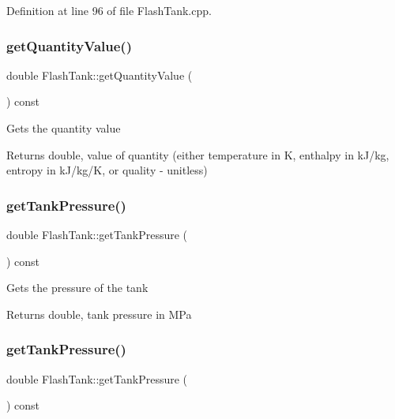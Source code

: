 Definition at line 96 of file Flash\+Tank.\+cpp.

\mbox{\label{class_flash_tank_ab2145598969881df58736a1b65326d17}} 
\subsubsection{\texorpdfstring{get\+Quantity\+Value()}{getQuantityValue()}\hspace{0.1cm}{\footnotesize\ttfamily [3/3]}}
{\footnotesize\ttfamily double Flash\+Tank\+::get\+Quantity\+Value (\begin{DoxyParamCaption}{ }\end{DoxyParamCaption}) const}

Gets the quantity value \begin{DoxyReturn}{Returns}
double, value of quantity (either temperature in K, enthalpy in k\+J/kg, entropy in k\+J/kg/K, or quality -\/ unitless) 
\end{DoxyReturn}
\mbox{\label{class_flash_tank_af5d4f0bf7babe61120e1e4452594e1af}} 
\subsubsection{\texorpdfstring{get\+Tank\+Pressure()}{getTankPressure()}\hspace{0.1cm}{\footnotesize\ttfamily [1/3]}}
{\footnotesize\ttfamily double Flash\+Tank\+::get\+Tank\+Pressure (\begin{DoxyParamCaption}{ }\end{DoxyParamCaption}) const}

Gets the pressure of the tank \begin{DoxyReturn}{Returns}
double, tank pressure in M\+Pa 
\end{DoxyReturn}
\mbox{\label{class_flash_tank_af5d4f0bf7babe61120e1e4452594e1af}} 
\subsubsection{\texorpdfstring{get\+Tank\+Pressure()}{getTankPressure()}\hspace{0.1cm}{\footnotesize\ttfamily [2/3]}}
{\footnotesize\ttfamily double Flash\+Tank\+::get\+Tank\+Pressure (\begin{DoxyParamCaption}{ }\end{DoxyParamCaption}) const}

